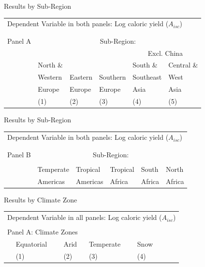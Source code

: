 \documentclass[10pt, xcolor=dvipsnames]{beamer}
\begin{document}
\begin{frame}{Results by Sub-Region}\label{subregiontab}

{\scriptsize
\begin{tabularx}{\textwidth}{lXXXXX}
\midrule
\multicolumn{6}{l}{Dependent Variable in both panels: Log caloric yield ($A_{isc}$)} \\ \\
\\
Panel A & \multicolumn{5}{c}{Sub-Region:} \\ \cmidrule{2-6}
 &          &         &             &  \multicolumn{2}{c}{Excl. China} \\ \cmidrule(lr){5-6}
 & North \& &         &              & South \&  & Central \&             \\
 & Western  & Eastern & Southern     & Southeast & West        \\
 & Europe   & Europe  & Europe       & Asia      & Asia      \\
 & (1) & (2) & (3) & (4) & (5) \\
\midrule

\midrule
\end{tabularx}
}
\end{frame}

\begin{frame}{Results by Sub-Region}

{\scriptsize
\begin{tabularx}{\textwidth}{lXXXXX}
\midrule
\multicolumn{6}{l}{Dependent Variable in both panels: Log caloric yield ($A_{isc}$)} \\ \\
\\
Panel B & \multicolumn{5}{c}{Sub-Region:} \\ \cmidrule{2-6}
 &           &   &           &          &             \\
 & Temperate & Tropical  & Tropical & South    & North    \\
 & Americas  & Americas  & Africa   & Africa   & Africa     \\
\midrule

\midrule
\end{tabularx}
}

\hfill \hyperlink{subregion}{}
\end{frame}


\begin{frame}{Results by Climate Zone}\label{climatereg}

{\scriptsize
\begin{tabularx}{\textwidth}{lXXXXXX}
\midrule
\multicolumn{7}{l}{Dependent Variable in all panels: Log caloric yield ($A_{isc}$)} \\ \\
\multicolumn{7}{l}{Panel A: Climate Zones} \\
 & Equatorial & Arid  & Temperate & Snow &     &   \\
 & (1) & (2) & (3) & (4) &  & \\
\midrule

\midrule
\end{tabularx}
}

\end{frame}
\end{document}
